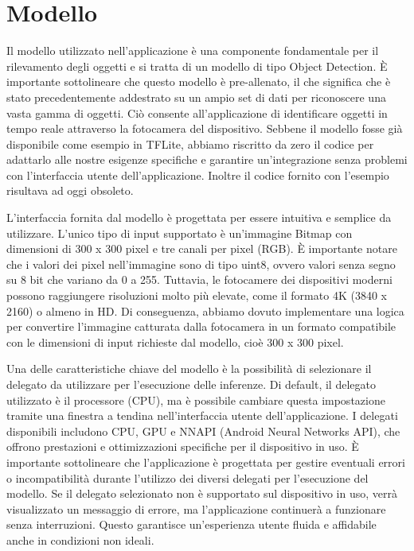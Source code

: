 \section{Modello}
Il modello utilizzato nell'applicazione è una componente fondamentale per il rilevamento degli oggetti e si tratta di un modello di tipo Object Detection.
È importante sottolineare che questo modello è pre-allenato, il che significa che è stato precedentemente addestrato su un ampio set di dati per riconoscere
una vasta gamma di oggetti. Ciò consente all'applicazione di identificare oggetti in tempo reale attraverso la fotocamera del dispositivo.
Sebbene il modello fosse già disponibile come esempio in TFLite, abbiamo riscritto da zero il codice per adattarlo alle nostre esigenze specifiche e
garantire un'integrazione senza problemi con l'interfaccia utente dell'applicazione. Inoltre il codice fornito con l’esempio risultava ad oggi obsoleto.

L'interfaccia fornita dal modello è progettata per essere intuitiva e semplice da utilizzare. L'unico tipo di input supportato è un'immagine Bitmap con
dimensioni di 300 x 300 pixel e tre canali per pixel (RGB). È importante notare che i valori dei pixel nell'immagine sono di tipo uint8, ovvero valori
senza segno su 8 bit che variano da 0 a 255.
Tuttavia, le fotocamere dei dispositivi moderni possono raggiungere risoluzioni molto più elevate, come il formato 4K (3840 x 2160) o almeno in HD. Di
conseguenza, abbiamo dovuto implementare una logica per convertire l'immagine catturata dalla fotocamera in un formato compatibile con le dimensioni di
input richieste dal modello, cioè 300 x 300 pixel.

Una delle caratteristiche chiave del modello è la possibilità di selezionare il delegato da utilizzare per l'esecuzione delle inferenze. Di default, il
delegato utilizzato è il processore (CPU), ma è possibile cambiare questa impostazione tramite una finestra a tendina nell'interfaccia utente
dell'applicazione. I delegati disponibili includono CPU, GPU e NNAPI (Android Neural Networks API), che offrono prestazioni e ottimizzazioni specifiche
per il dispositivo in uso.
È importante sottolineare che l'applicazione è progettata per gestire eventuali errori o incompatibilità durante l'utilizzo dei diversi delegati per
l'esecuzione del modello. Se il delegato selezionato non è supportato sul dispositivo in uso, verrà visualizzato un messaggio di errore, ma l'applicazione
continuerà a funzionare senza interruzioni. Questo garantisce un'esperienza utente fluida e affidabile anche in condizioni non ideali.

